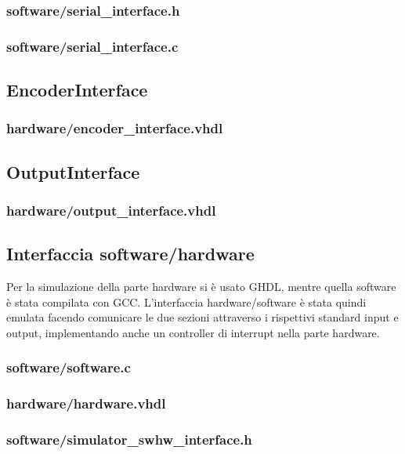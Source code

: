 \documentclass [11pt,a4paper,oneside]{paper}
\newcommand{\inputVHDL}[1]{}
\newcommand{\inputC}[1]{}
\begin{document}
\subsubsection{software/serial\_interface.h}
\inputC{software/serial_interface.h}
\subsubsection{software/serial\_interface.c}
\inputC{software/serial_interface.c}

\subsection{EncoderInterface}
\subsubsection{hardware/encoder\_interface.vhdl}
\inputVHDL{hardware/encoder_interface.vhdl}

\subsection{OutputInterface}
\subsubsection{hardware/output\_interface.vhdl}
\inputVHDL{hardware/output_interface.vhdl}

\subsection{Interfaccia software/hardware}
Per la simulazione della parte hardware si è usato GHDL, mentre quella software
è stata compilata con GCC. L'interfaccia hardware/software è stata quindi emulata
facendo comunicare le due sezioni attraverso i rispettivi standard input e output,
implementando anche un controller di interrupt nella parte hardware.

\subsubsection{software/software.c}
\inputC{software/software.c}

\subsubsection{hardware/hardware.vhdl}
\inputVHDL{hardware/hardware.vhdl}

\subsubsection{software/simulator\_swhw\_interface.h}
\inputC{software/simulator_swhw_interface.h}
\end{document}
